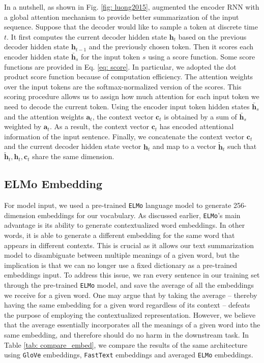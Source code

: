 In a nutshell, as shown in Fig. \ref{fig: luong2015}, \cite{luong2015effective} augmented the encoder RNN with a global attention mechanism to provide better summarization of the input sequence. Suppose that the decoder would like to sample a token at discrete time $t$. It first computes the current decoder hidden state $\bm{h}_t$ based on the previous decoder hidden state $\bm{h}_{t-1}$ and the previously chosen token. Then it scores each encoder hidden state $\bm{\bar h}_s$ for the input token $s$ using a score function. Some score functions are provided in Eq. \ref{eq: score}. In particular, we adopted the dot product score function because of computation efficiency. The attention weights over the input tokens are the softmax-normalized version of the scores. This scoring procedure allows us to assign how much attention for each input token we need to decode the current token. Using the encoder input token hidden states $\bm{\bar h}_s$ and the attention weights $\bm{a}_t$, the context vector $\bm{c}_t$ is obtained by a sum of $\bm{\bar h}_s$ weighted by $\bm{a}_t$. As a result, the context vector $\bm{c}_t$ has encoded attentional information of the input sentence. Finally, we concatenate the context vector $\bm{c}_t$ and the current decoder hidden state vector $\bm{h}_t$ and map to a vector $\bm{\tilde h}_t$ such that $\bm{\tilde h}_t, \bm{h}_t, \bm{c}_t$ share the same dimension.


\subsection{ELMo Embedding}
For model input, we used a pre-trained \texttt{ELMo} language model \cite{peters2018deep} to generate 256-dimension embeddings for our vocabulary. As discussed earlier, \texttt{ELMo}'s main advantage is its ability to generate contextualized word embeddings. In other words, it is able to generate a different embedding for the same word that appears in different contexts. This is crucial as it allows our text summarization model to disambiguate between multiple meanings of a given word, but the implication is that we can no longer use a fixed dictionary as a pre-trained embeddings input. To address this issue, we ran every sentence in our training set through the pre-trained \texttt{ELMo} model, and save the average of all the embeddings we receive for a given word. One may argue that by taking the average -- thereby having the same embedding for a given word regardless of its context -- defeats the purpose of employing the contextualized representation. However, we believe that the average essentially incorporates all the meanings of a given word into the same embedding, and therefore should do no harm in the downstream task. In Table \ref{tab: compare_embed}, we compare the results of the same architecture using \texttt{GloVe} embeddings, \texttt{FastText} embeddings and averaged \texttt{ELMo} embeddings. 

